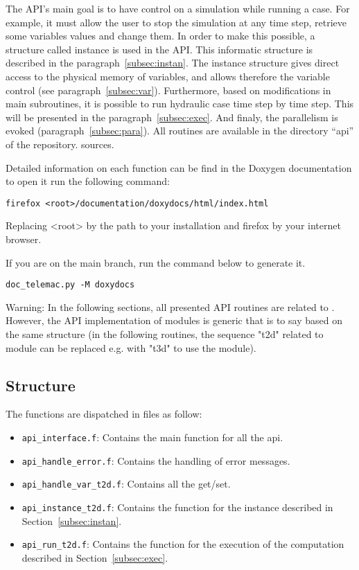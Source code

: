 The API’s main goal is to have control on a simulation while running a case.
For example, it must allow the user to stop the simulation at any time step,
retrieve some variables values and change them. In order to make this possible,
a \fortran{} structure called instance is used in the API\@. This informatic
structure is described in the paragraph~\ref{subsec:instan}. The instance
structure gives direct access to the physical memory of variables, and allows
therefore the variable control (see paragraph~\ref{subsec:var}). Furthermore,
based on modifications in \telemacsystem{} main subroutines, it is possible to
run hydraulic case time step by time step. This will be
presented in the paragraph~\ref{subsec:exec}. And finaly, the parallelism is
evoked (paragraph~\ref{subsec:para}).
All \fortran{} routines are available in the directory ``api'' of the
\telemacsystem{} repository.
sources.

Detailed information on each function can be find in the Doxygen documentation
to open it run the following command:

\begin{lstlisting}
firefox <root>/documentation/doxydocs/html/index.html
\end{lstlisting}

Replacing <root> by the path to your installation and firefox by your internet
browser.

If you are on the main branch, run the command below to generate it.

\begin{lstlisting}
doc_telemac.py -M doxydocs
\end{lstlisting}

\begin{WarningBlock}{Warning:}
\centering
 In the following sections, all presented API routines are related to
 . However, the API implementation of \telemacsystem{} modules is
 generic that is to say based on the same structure (in the following routines,
 the sequence "t2d" related to  module can be replaced e.g. with
 "t3d" to use the  module).
\end{WarningBlock}

\subsection{Structure}

The functions are dispatched in \fortran{} files as follow:
\begin{itemize}
  \item \verb!api_interface.f!: Contains the main function for all the api.
  \item \verb!api_handle_error.f!: Contains the handling of error messages.
  \item \verb!api_handle_var_t2d.f!: Contains all the get/set.
  \item \verb!api_instance_t2d.f!: Contains the function for the instance
    described in Section~\ref{subsec:instan}.
  \item \verb!api_run_t2d.f!: Contains the function for the execution of the
    computation described in Section~\ref{subsec:exec}.
\end{itemize}


